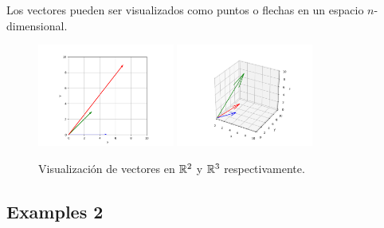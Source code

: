 Los vectores pueden ser visualizados como puntos o flechas en un espacio $n$-dimensional.

\begin{figure}[htbp]
    \centering
    \includegraphics[width=0.4\textwidth]{Images/1/vectors.png}
    \hspace{2cm} 
    \includegraphics[width=0.4\textwidth]{Images/1/vectors_3d.png}
    \caption{Visualización de vectores en $\mathbb{R}^2$ y $\mathbb{R}^3$ respectivamente.}
    \label{fig:imagenes}
\end{figure}

\lipsum[1]

\subsection{Examples 2}
